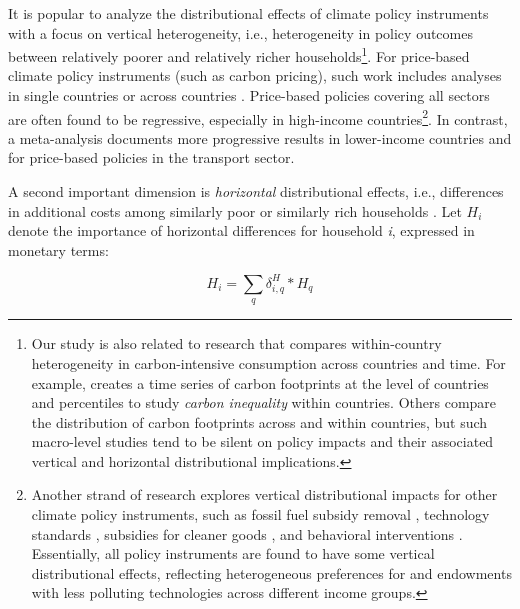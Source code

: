 \documentclass[12pt, a4paper]{article}
\begin{document}
It is popular to analyze the distributional effects of climate policy instruments with a focus on vertical heterogeneity, i.e., heterogeneity in policy outcomes between relatively poorer and relatively richer households\footnote{Our study is also related to research that compares within-country heterogeneity in carbon-intensive consumption across countries and time. For example, \textcite{Chancel.2022b} creates a time series of carbon footprints at the level of countries and percentiles to study \textit{carbon inequality} within countries. Others \autocite{Oswald.2020,Bruckner.2022} compare the distribution of carbon footprints across and within countries, but such macro-level studies tend to be silent on policy impacts and their associated vertical and horizontal distributional implications.}. For price-based climate policy instruments (such as carbon pricing), such work includes analyses in single countries \autocite{Poterba.1991,Goulder.2019,Grainger.2010,Rausch.2011,Garaffa.2021,Sterner.2012,Wu.2022} or across countries \autocite{Budolfson.2021,Feindt.2021,Dorband.2019,Steckel.2021b,VogtSchilb.2019,Missbach.2024}. Price-based policies covering all sectors are often found to be regressive, especially in high-income countries\footnote{Another strand of research explores vertical distributional impacts for other climate policy instruments, such as fossil fuel subsidy removal \autocite{Schaffitzel.2019,Giuliano.2020,DelArzeGranado.2012}, technology standards \autocite{Levinson.2019,Zhao.2022,Bruegge.2019}, subsidies for cleaner goods \autocite{Borenstein.2016,Vaishnav.2017,Winter.2019}, and behavioral interventions \autocite{DellaValle.2020,Liebe.2021}. Essentially, all policy instruments are found to have some vertical distributional effects, reflecting heterogeneous preferences for and endowments with less polluting technologies across different income groups.}. In contrast, a meta-analysis \autocite{Ohlendorf.2021} documents more progressive results in lower-income countries and for price-based policies in the transport sector.

A second important dimension is \textit{horizontal} distributional effects, i.e., differences in additional costs among similarly poor or similarly rich households \autocite{Rausch.2011,Fischer.2019}. Let $H_{i}$ denote the importance of horizontal differences for household \textit{i}, expressed in monetary terms:

\begin{equation}\label{eq_H}
    H_{i} = \sum_{q} \delta_{i,q}^{H} * H_{q}
\end{equation}
\end{document}

